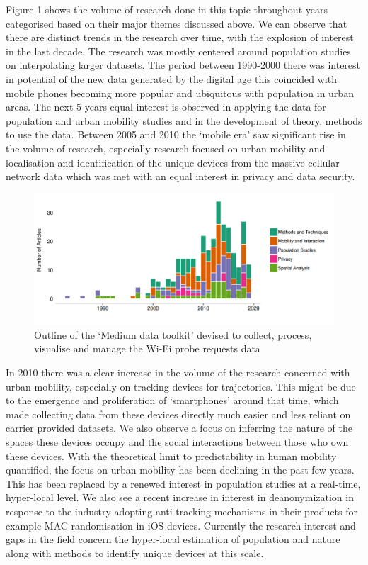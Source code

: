 Figure 1 shows the volume of research done in this topic throughout years categorised based on their major themes discussed above.
We can observe that there are distinct trends in the research over time, with the explosion of interest in the last decade.
The research was mostly centered around population studies on interpolating larger datasets.
The period between 1990-2000 there was interest in potential of the new data generated by the digital age this coincided with mobile phones becoming more popular and ubiquitous with population in urban areas.
The next 5 years equal interest is observed in applying the data for population and urban mobility studies and in the development of theory, methods to use the data.
Between 2005 and 2010 the ‘mobile era’ saw significant rise in the volume of research, especially research focused on urban mobility and localisation and identification of the unique devices from the massive cellular network data which was met with an equal interest in privacy and data security.

\begin{figure}
  \includegraphics{images/literature-themes-timeline.png}
  \caption{Outline of the `Medium data toolkit' devised to collect, process, visualise and manage the Wi-Fi probe requests data}
  \label{figure:literature:themes:timeline}
\end{figure}

In 2010 there was a clear increase in the volume of the research concerned with urban mobility, especially on tracking devices for trajectories.
This might be due to the emergence and proliferation of ‘smartphones’ around that time, which made collecting data from these devices directly much easier and less reliant on carrier provided datasets.
We also observe a focus on inferring the nature of the spaces these devices occupy and the social interactions between those who own these devices.
With the theoretical limit to predictability in human mobility quantified, the focus on urban mobility has been declining in the past few years.
This has been replaced by a renewed interest in population studies at a real-time, hyper-local level.
We also see a recent increase in interest in deanonymization in response to the industry adopting anti-tracking mechanisms in their products for example MAC randomisation in iOS devices.
Currently the research interest and gaps in the field concern the hyper-local estimation of population and nature along with methods to identify unique devices at this scale.
